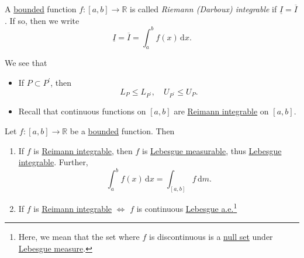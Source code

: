 \begin{definition}\label{def:Riemann-integrable}
	A \underline{bounded} function \(f\colon [a, b]\to \mathbb{R} \) is called \emph{Riemann (Darboux) integrable}
	if \(\underline{I} = \overline{I}\). If so, then we write
	\[
		\underline{I} = \overline{I} = \int_{a}^{b} f(x) \,\mathrm{d}x.
	\]
\end{definition}
\begin{note}
	We see that
	\begin{itemize}
		\item If \(P\subset P ^\prime \), then
		      \[
			      L_{P}\leq L_{P ^\prime },\quad U_{P ^\prime }\leq U_{P}.
		      \]
		\item Recall that continuous functions on \([a, b]\) are \hyperref[def:Riemann-integrable]{Reimann integrable} on \([a, b]\).
	\end{itemize}
\end{note}
\begin{theorem}
	Let \(f\colon [a, b]\to \mathbb{R} \) be a \underline{bounded} function. Then
	\begin{enumerate}[(1)]
		\item If \(f\) is \hyperref[def:Riemann-integrable]{Reimann integrable}, then \(f\) is \hyperref[def:measurable-function]{Lebesgue measurable}, thus
		      \hyperref[def:integrable]{Lebesgue integrable}. Further,
		      \[
			      \int_{a}^{b} f(x) \,\mathrm{d}x = \int_{[a, b]}f \,\mathrm{d}m.
		      \]
		\item If \(f\) is \hyperref[def:Riemann-integrable]{Reimann integrable} \(\iff \) \(f\) is continuous \underline{\hyperref[def:Lebesgue-measure]{Lebesgue} \hyperref[def:mu-almost-everywhere]{a.e.}}\footnote{Here, we
			      mean that the set where \(f\) is discontinuous is a \hyperref[def:mu-null-set]{null set} under \hyperref[def:Lebesgue-measure]{Lebesgue measure}.}
	\end{enumerate}
\end{theorem}
